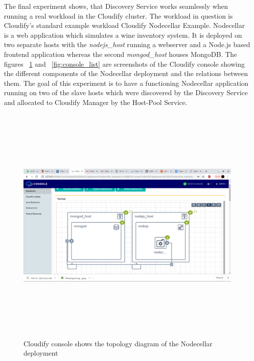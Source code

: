 The final experiment shows, that Discovery Service works seamlessly when running a real workload in the Cloudify cluster. The workload in question is Cloudify's standard example workload Cloudify Nodecellar Example\cite{Nodecellar}. Nodecellar is a web application which simulates a wine inventory system. It is deployed on two separate hosts with the \textit{nodejs\_host} running a webserver and a Node.js based frontend application whereas the second \textit{mongod\_host} houses MongoDB. The figures ~\ref{fig:console_topology} and ~\ref{fig:console_list} are screenshots of the Cloudify console showing the different components of the Nodecellar deployment and the relations between them. The goal of this experiment is to have a functioning Nodecellar application running on two of the slave hosts which were discovered by the Discovery Service and allocated to Cloudify Manager by the Host-Pool Service.

 \begin{figure}[ht!]
\centering
  \includegraphics[width=12cm,height=12cm, keepaspectratio]{consoletopology.png}%
  \caption{Cloudify console shows the topology diagram of the Nodecellar deployment}
  \label{fig:console_topology}
\end{figure}

